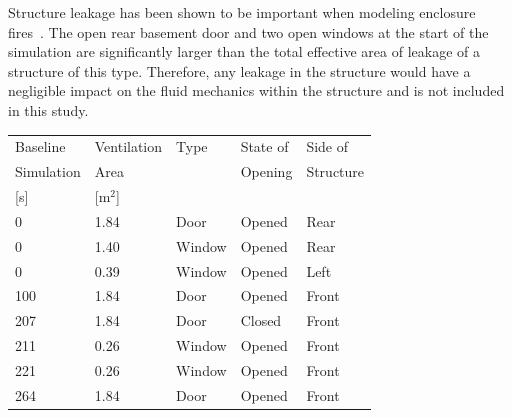\documentclass[12pt,oneside]{book}
\begin{document}
Structure leakage has been shown to be important when modeling enclosure fires~\cite{beal2009}. The open rear basement door and two open windows at the start of the simulation are significantly larger than the total effective area of leakage of a structure of this type. Therefore, any leakage in the structure would have a negligible impact on the fluid mechanics within the structure and is not included in this study.


\begin{table}
\centering
{}\label{tab:vents}
\begin{tabular}{lllll}
\toprule[1.5pt]
Baseline     &   Ventilation   &  Type       & State of       &  Side of  \\
Simulation  &  Area             &                 & Opening     &  Structure  \\
{[s]}             &  {[m$^2$]}     &                 &                    &                  \\
\midrule
0               &  1.84             &  Door        &  Opened     &  Rear  \\
0               &  1.40             &  Window      &  Opened     &  Rear  \\
0               &  0.39             &  Window      &  Opened     &  Left   \\
100             &  1.84             &  Door        &  Opened     &  Front   \\
207             &  1.84             &  Door        &  Closed     &  Front   \\
211             &  0.26             &  Window      &  Opened     &  Front   \\
221             &  0.26             &  Window      &  Opened     &  Front  \\
264             &  1.84             &  Door        &  Opened     & Front  \\
\bottomrule[1.25pt]
\end{tabular}\par
\footnotesize
\normalsize
\end{table}
\end{document}
